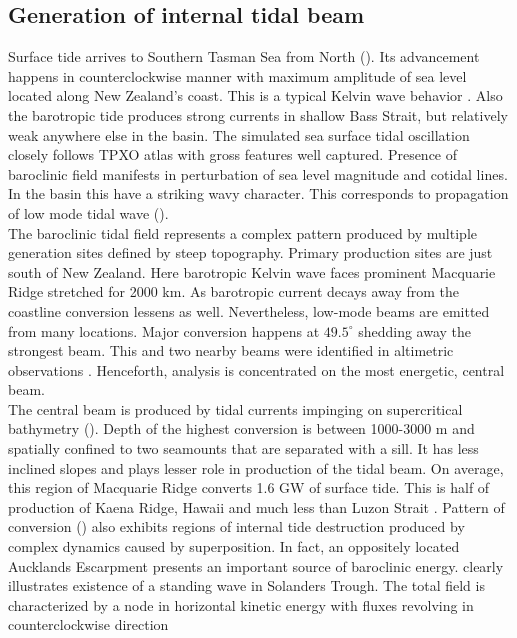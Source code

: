 \documentclass[12pt]{article}
\begin{document}
\subsection{Generation of internal tidal beam}
Surface tide arrives to Southern Tasman Sea from North (). Its 
advancement happens in counterclockwise manner with maximum amplitude of sea level located along 
New Zealand's coast. This is a typical Kelvin wave behavior \citep{walters2001ocean}. Also the 
barotropic tide produces strong currents in shallow Bass Strait, but relatively weak anywhere else 
in the basin. The simulated sea surface tidal oscillation closely follows TPXO atlas with gross 
features well captured. Presence of baroclinic field manifests in perturbation of sea level 
magnitude and cotidal lines. In the basin this have a striking wavy character. This corresponds to 
propagation of low mode tidal wave ().\\
The baroclinic tidal field represents a complex pattern produced by multiple generation sites 
defined by steep topography. Primary production sites are just south of New Zealand. Here 
barotropic Kelvin wave faces prominent Macquarie Ridge stretched for 2000 km. As barotropic current 
decays away from the coastline conversion lessens as well. Nevertheless, low-mode beams are emitted 
from many locations. Major conversion happens at $49.5^{\circ}$ shedding away the strongest beam. 
This and two nearby beams were identified in altimetric observations \citep{zhao2018satellite}. 
Henceforth, analysis is concentrated on the most energetic, central beam.\\
The central beam is produced by tidal currents impinging on supercritical bathymetry 
(). Depth of the highest conversion is between 1000-3000 m and spatially confined 
to two seamounts that are separated with a sill. It has less inclined slopes and plays 
lesser role in production of the tidal beam. On average, this region of Macquarie Ridge converts 
1.6 GW of surface tide. This is half of production of Kaena Ridge, Hawaii 
\citep{carter2008energetics} and much less than Luzon Strait \citep{}. Pattern of conversion 
() also exhibits regions of internal tide destruction produced by complex 
dynamics caused by superposition. In fact, an oppositely located Aucklands Escarpment presents an 
important 
source of 
baroclinic energy.  clearly illustrates existence of a standing wave in 
Solanders Trough. The total field is characterized 
by a node in horizontal kinetic energy with fluxes revolving in counterclockwise direction 
\end{document}
